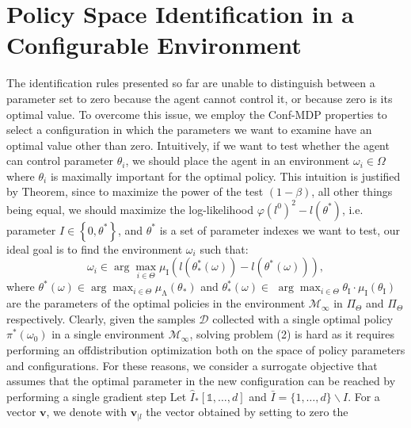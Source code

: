 \documentclass{article}
\begin{document}
\section*{Policy Space Identification in a Configurable Environment}
The identification rules presented so far are unable to distinguish between a parameter set to zero because the agent cannot control it, or because zero is its optimal value. To overcome this issue, we employ the Conf-MDP properties to select a configuration in which the parameters we want to examine have an optimal value other than zero. Intuitively, if we want to test whether the agent can control parameter \(\theta_{i}\), we should place the agent in an environment \(\omega_{i} \in \Omega\) where \(\theta_{i}\) is maximally important for the optimal policy. This intuition is justified by Theorem, since to maximize the power of the test \((1-\beta)\), all other things being equal, we should maximize the log-likelihood \(\varphi\left(l^{0}\right)^{2}-l\left(\theta^{*}\right)\), i.e. parameter \(I \in\left\{0, \theta^{*}\right\}\), and \(\theta^{*}\) is a set of parameter indexes we want to test, our ideal goal is to find the environment \(\omega_{i}\) such that:
\[
\omega_{i} \in \arg \max _{i \in \Theta} \mu_{\mathrm{I}}\left(l\left(\theta_{*}^{*}(\omega)\right)-l\left(\theta^{*}(\omega)\right)\right),
\]
where \(\theta^{*}(\omega) \in \arg \max _{i \in \Theta} \mu_{\mathrm{\Lambda}}\left(\theta_{*}\right)\) and \(\theta_{*}^{*}(\omega) \in\) \(\arg \max _{i \in \Theta} \theta_{\mathrm{I}} \cdot \mu_{\mathrm{I}}\left(\theta_{\mathrm{I}}\right)\) are the parameters of the optimal policies in the environment \(\mathcal{M}_{\infty}\) in \(\Pi_{\Theta}\) and \(\Pi_{\Theta}\) respectively. Clearly, given the samples \(\mathcal{D}\) collected with a single optimal policy \(\pi^{*}(\omega_{0})\) in a single environment \(\mathcal{M}_{\infty}\), solving problem (2) is hard as it requires performing an offdistribution optimization both on the space of policy parameters and configurations. For these reasons, we consider a surrogate objective that assumes that the optimal parameter in the new configuration can be reached by performing a single gradient step
Let \(\hat{I}_{*}[\mathbb{1}, \ldots, d]\) and \(\bar{I}=\{1, \ldots, d\} \backslash I\). For a vector \(\mathbf{v}\), we denote with \(\mathbf{v}_{\mid l}\) the vector obtained by setting to zero the
\end{document}
